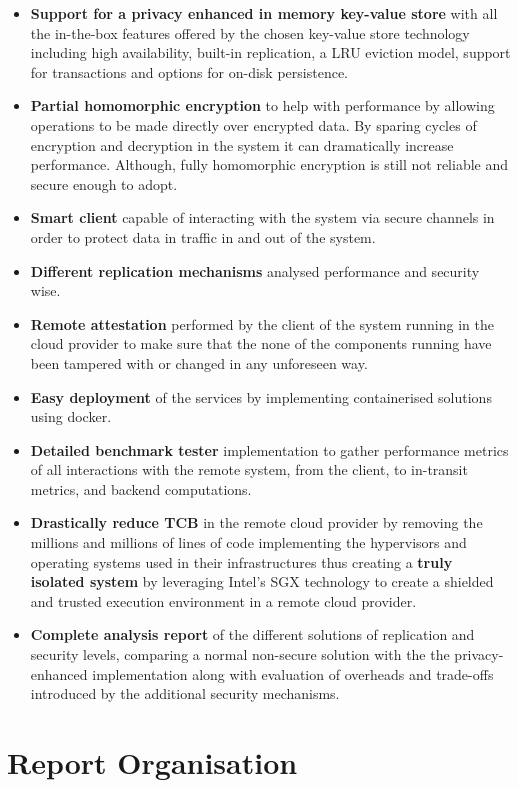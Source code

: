 \begin{itemize}
  \item \textbf{Support for a privacy enhanced in memory key-value store} with all the in-the-box features offered by the chosen key-value store technology including high availability, built-in replication, a \gls{LRU} eviction model, support for transactions and options for on-disk persistence.
  \item \textbf{Partial homomorphic encryption} to help with performance by allowing operations to be made directly over encrypted data. By sparing cycles of encryption and decryption in the system it can dramatically increase performance. Although, fully homomorphic encryption is still not reliable and secure enough to adopt.
  \item \textbf{Smart client} capable of interacting with the system via secure channels in order to protect data in traffic in and out of the system. 
  \item \textbf{Different replication mechanisms} analysed performance and security wise.
  \item \textbf{Remote attestation} performed by the client of the system running in the cloud provider to make sure that the none of the components running have been tampered with or changed in any unforeseen way.
  \item \textbf{Easy deployment} of the services by implementing containerised solutions using docker.
  \item \textbf{Detailed benchmark tester} implementation to gather performance metrics of all interactions with the remote system, from the client, to in-transit metrics, and backend computations.
  \item \textbf{Drastically reduce TCB} in the remote cloud provider by removing the millions and millions of lines of code implementing the hypervisors and operating systems used in their infrastructures thus creating a \textbf{truly isolated system} by leveraging Intel's \gls{SGX} technology to create a shielded and trusted execution environment in a remote cloud provider.
  \item \textbf{Complete analysis report} of the different solutions of replication and security levels, comparing a normal non-secure solution with the the privacy-enhanced implementation along with evaluation of overheads and trade-offs introduced by the additional security mechanisms.
\end{itemize}

\section{Report Organisation}
\label{sec:report_organisation}

